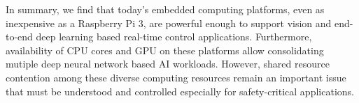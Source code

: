In summary, we find that today's embedded computing platforms, even as
inexpensive as a Raspberry Pi 3, are powerful enough to support
vision and end-to-end deep learning based real-time control
applications. Furthermore, availability of CPU cores and GPU on these
platforms allow consolidating mutiple deep neural network based AI
workloads. However, shared resource contention among these diverse
computing resources remain an important issue that must be understood
and controlled especially for safety-critical applications.




